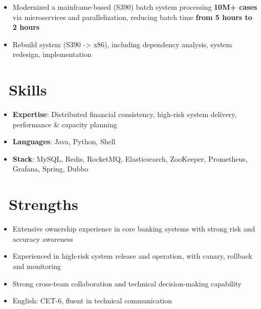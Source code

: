 \documentclass{resume}
\begin{document}

\begin{onehalfspacing}
\begin{itemize}
  \item Modernized a mainframe-based (S390) batch system processing \textbf{10M+ cases} via microservices and parallelization, reducing batch time \textbf{from 5 hours to 2 hours}
  \item Rebuild system (S390 -> x86), including dependency analysis, system redesign, implementation
\end{itemize}
\end{onehalfspacing}

\section{\faCogs\ Skills}
\begin{itemize}[parsep=0.5ex]
  \item \textbf{Expertise}: Distributed financial consistency, high-risk system delivery, performance \& capacity planning
  \item \textbf{Languages}: Java, Python, Shell
  \item \textbf{Stack}: MySQL, Redis, RocketMQ, Elasticsearch, ZooKeeper, Prometheus, Grafana, Spring, Dubbo
\end{itemize}

\section{\faInfo\ Strengths}
\begin{itemize}
  \item Extensive ownership experience in core banking systems with strong risk and accuracy awareness
  \item Experienced in high-risk system release and operation, with canary, rollback and monitoring
  \item Strong cross-team collaboration and technical decision-making capability
  \item English: CET-6, fluent in technical communication
\end{itemize}
\end{document}
